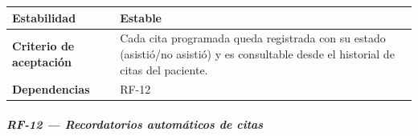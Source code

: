 {\def\LTcaptype{none} %
\begin{longtable}[]{@{}
  >{\raggedright\arraybackslash}p{}
  >{\raggedright\arraybackslash}p{}@{}}
\toprule\noalign{}
\begin{minipage}[b]{\linewidth}\raggedright
\textbf{Estabilidad}
\end{minipage} & \begin{minipage}[b]{\linewidth}\raggedright
Estable
\end{minipage} \\
\midrule\noalign{}
\endhead
\bottomrule\noalign{}
\endlastfoot
\textbf{Criterio de aceptación} &
\begin{minipage}[t]{\linewidth}\raggedright
Cada cita programada queda registrada con su estado (asistió/no asistió)
y es consultable desde el historial de citas del paciente.
\end{minipage} \\
\textbf{Dependencias} & \begin{minipage}[t]{\linewidth}\raggedright
RF-12
\end{minipage} \\
\end{longtable}
}

\subparagraph{RF-12 --- Recordatorios automáticos de
citas}\label{rf-12-recordatorios-automuxe1ticos-de-citas}

